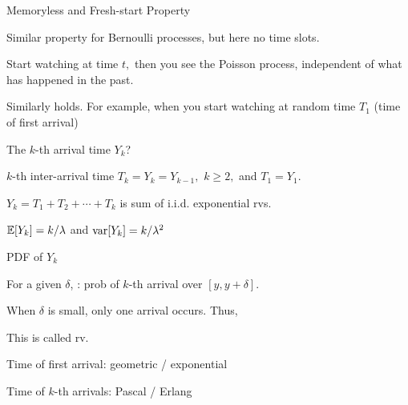 \documentclass[fleqn,aspectratio=169]{beamer}
\begin{document}
\begin{frame}{Memoryless and Fresh-start Property}

\plitemsep 0.1in
\bci
\item {} Similar property for Bernoulli processes, but here no time slots. 

\item<2->  Start watching at time $t,$ then you see the Poisson process, independent of what has happened in the past. 

\item<3->  Similarly holds. For example, when you start watching at random time $T_1$ (time of first arrival)

\item<4->  The $k$-th arrival time $Y_k$?

\item<5-> $k$-th inter-arrival time $T_k = Y_k = Y_{k-1},$ $k\ge 2,$ and $T_1 = Y_1.$

\item<6-> $Y_k = T_1 + T_2 + \cdots + T_k$ is sum of i.i.d. exponential rvs. 

\item<7-> $\mathbb{E}[ Y_k ] = k/\lambda$ and $\text{var}[ Y_k ] = k/\lambda^2$
\eci
\end{frame}

\begin{frame}{PDF of $Y_k$}

\plitemsep 0.07in
\bci
\item<2-> For a given $\delta$, : prob of $k$-th arrival over $[y,y+\delta].$

\item<4-> When $\delta$ is small, only one arrival occurs. Thus, 

\item<8-> This is called  rv. 

\bigskip
\item<9-> Time of first arrival: geometric / exponential
\item<9-> Time of $k$-th arrivals: Pascal / Erlang
\eci
\end{frame}
\end{document}
